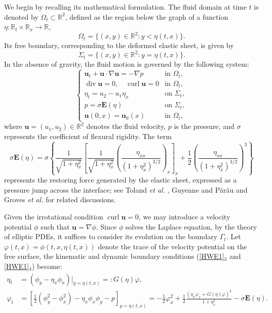 \documentclass[10pt]{amsart}
\theoremstyle{remark}
\theoremstyle{definition}
\numberwithin{equation}{section}
\newcommand{\f}{\frac}
\begin{document}
We begin by recalling its mathematical formulation. The fluid domain at time \( t \) is denoted by \( \Omega_t \subset \mathbb{R}^2 \), defined as the region below the graph of a function \( \eta: \mathbb{R}_t \times \mathbb{R}_x \to \mathbb{R} \),
\[
\Omega_t = \{ (x, y) \in \mathbb{R}^2 : y < \eta(t, x) \}.
\]
Its free boundary, corresponding to the deformed elastic sheet, is given by
\[
\Sigma_t = \{ (x, y) \in \mathbb{R}^2 : y = \eta(t, x) \}.
\]
In the absence of gravity, the fluid motion is governed by the following system:
\begin{equation}\label{HWE1}
    \begin{cases}
        \mathbf{u}_t + \mathbf{u} \cdot \nabla \mathbf{u} = -\nabla p & \text{in } \Omega_t, \\
\operatorname{div} \mathbf{u} = 0, \quad \operatorname{curl} \mathbf{u} = 0 & \text{in } \Omega_t, \\
\eta_t=u_2-u_1\eta_x&\text{on } \Sigma_t,\\
        p = \sigma \mathbf{E}(\eta) & \text{on } \Sigma_t, \\
        \mathbf{u}(0, x) = \mathbf{u}_0(x) & \text{in } \Omega_t,
    \end{cases}
\end{equation}
where \( \mathbf{u} = (u_1, u_2) \in \mathbb{R}^2 \) denotes the fluid velocity, \( p \) is the pressure, and \( \sigma \) represents the coefficient of flexural rigidity. The term
\begin{equation}\label{Elastic}
    \sigma\mathbf{E}(\eta) =\sigma\left\{\frac{1}{\sqrt{1+\eta_x^2}} 
    \left[ \frac{1}{\sqrt{1+\eta_x^2}} 
    \left( \frac{\eta_{xx}}{(1+\eta_x^2)^{3/2}} \right)_x \right]_x
    + \frac{1}{2} \left( \frac{\eta_{xx}}{(1+\eta_x^2)^{3/2}} \right)^3\right\}
\end{equation}
represents the restoring force generated by the elastic sheet, expressed as a pressure jump across the interface;
 see Toland \textit{et al.} \cite{MR2413099,MR2812947}, Guyenne and P\u ar\u au \cite{MR3002503} and Groves \textit{et al.} \cite{MR4733013,MR3566507} for related discussions. 
 
Given the irrotational condition \( \operatorname{curl} \mathbf{u} = 0 \), we may introduce a velocity potential \( \phi \) such that \( \mathbf{u} = \nabla \phi \).
Since $\phi$ solves the Laplace equation, by the theory of elliptic PDEs, it suffices to consider its evolution on the boundary $\Gamma_t$.
Let \( \varphi(t, x) = \phi(t, x, \eta(t, x)) \) denote the trace of the velocity potential on the free surface, the kinematic and dynamic boundary conditions (\eqref{HWE1}$_3$ and \eqref{HWE1}$_4$) become:
\begin{align}
    \eta_t &=(\phi_y - \eta_x \phi_x)|_{y=\eta(t,x)}=: G(\eta)\varphi, \label{kin} \\
    \varphi_t &=\left[\frac{1}{2} \left( \phi_y^2 - \phi_x^2 \right) - \eta_x \phi_x \phi_y-p\right]_{y=\eta(t,x)}=-\frac{1}{2} \varphi_x^2+ \f12\f{(\eta_x\varphi_x+G(\eta)\varphi)^2}{1+\eta^2_x}- \sigma \mathbf{E}(\eta). \label{dyn}
\end{align}
\end{document}
